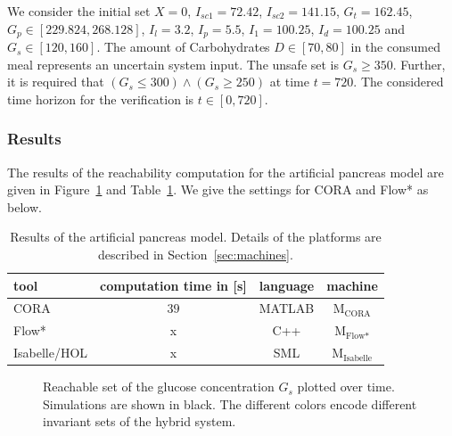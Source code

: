 \documentclass[EPiC]{easychair}
\begin{document}
We consider the initial set $X = 0$, $I_{sc1} = 72.42$, $I_{sc2}=141.15$, $G_t=162.45$, $G_p \in [229.824, 268.128]$, $I_l=3.2$, $I_p=5.5$, $I_1 = 100.25$, $I_d=100.25$ and $G_s \in [120,160]$. The amount of Carbohydrates $D \in [70,80]$ in the consumed meal represents an uncertain system input. The unsafe set is $G_s \geq 350$. Further, it is required that $(G_s \leq 300) \land (G_s \geq 250)$ at time $t = 720$. The considered time horizon for the verification is $t \in [0, 720]$. 

\subsubsection{Results}

The results of the reachability computation for the artificial pancreas model are given in Figure~\ref{fig:pancreas} and Table~\ref{tab:compTimes:pancreas}. We give the settings for CORA and Flow* as below.

\begin{table}[h]
	\setlength{\tabcolsep}{4pt}
	\renewcommand{\arraystretch}{1.2}
	\centering
	\caption{Results of the artificial pancreas model. Details of the platforms are described in Section~\ref{sec:machines}.}
	\begin{tabular}[c]{lccc}
	\hline
		 \textbf{tool} & \textbf{computation time in [s]} & \textbf{language} & \textbf{machine} \\
		 \hline
         CORA & $39$ & MATLAB & M$_{\text{CORA}}$ \\
         Flow* & x & C++ & M$_{\text{Flow*}}$ \\
         Isabelle/HOL & x & SML & M$_{\text{Isabelle}}$ \\
		 \hline
	\end{tabular}
	\label{tab:compTimes:pancreas}
\end{table}

\begin{figure}[ht!b]
\centering
{}
  \hspace{0.2in}
\caption{Reachable set of the glucose concentration $G_s$ plotted over time. Simulations are shown in black. The different colors encode different invariant sets of the hybrid system.}
\label{fig:pancreas}
\end{figure}
\end{document}

